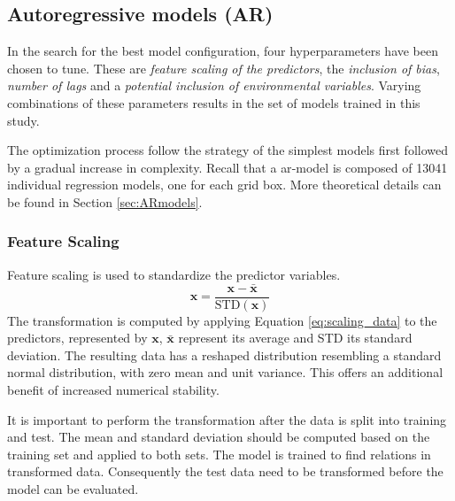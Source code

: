 \subsection{Autoregressive models (AR)}
In the search for the best model configuration, four hyperparameters have been chosen to tune. These are
\textit{feature scaling of the predictors}, the \textit{inclusion of bias}, \textit{number of lags} and a \textit{potential inclusion of environmental variables}. Varying combinations of these parameters results in the set of models trained in this study. 

The optimization process follow the strategy of the simplest models first followed by a gradual increase in complexity. 
Recall that a \acrshort{ar}-model is composed of 13041 individual regression models, one for each grid box.
More theoretical details can be found in Section \ref{sec:ARmodels}. 

\subsubsection{Feature Scaling} \label{sec:scaling_predictors}
Feature scaling is used to standardize the predictor variables.
\begin{equation} \label{eq:scaling_data}
    \mathbf{x} = \frac{\mathbf{x} - \bar{\mathbf{x}}}{\text{STD}(\mathbf{x})}
\end{equation}
The transformation is computed by applying Equation \eqref{eq:scaling_data} to the predictors, represented by $\mathbf{x}$, $\bar{\mathbf{x}}$ represent its average and STD its standard deviation. The resulting data has a reshaped distribution resembling a standard normal distribution, with zero mean and unit variance. This offers an additional benefit of increased numerical stability. %

It is important to perform the transformation after the data is split into training and test. The mean and standard deviation should be computed based on the training set and applied to both sets. The model is trained to find relations in transformed data. Consequently the test data need to be transformed before the model can be evaluated. 

